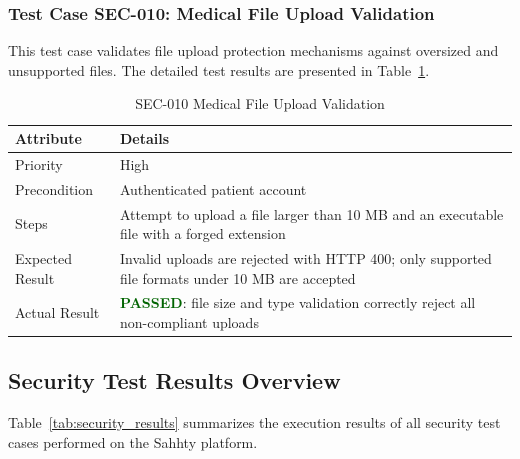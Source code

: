\subsubsection{Test Case SEC-010: Medical File Upload Validation}

This test case validates file upload protection mechanisms against oversized and unsupported files. The detailed test results are presented in Table~\ref{tab:sec010}.

\begin{table}[H]
\centering
\caption{SEC-010 Medical File Upload Validation}
\label{tab:sec010}
\renewcommand{\arraystretch}{1.3}

\begin{tabular}{|p{2cm}|p{13cm}|}
\hline
\rowcolor{red!10}

\textbf{Attribute} & \textbf{Details} \\
\hline
Priority & High \\
\hline
Precondition & Authenticated patient account \\
\hline
Steps & Attempt to upload a file larger than 10 MB and an executable file with a forged extension \\
\hline
Expected Result & Invalid uploads are rejected with HTTP 400; only supported file formats under 10 MB are accepted \\
\hline
Actual Result & \textbf{\textcolor{darkgreen}{PASSED}}: file size and type validation correctly reject all non-compliant uploads \\
\hline
\end{tabular}
\end{table}

\subsection{Security Test Results Overview}

Table~\ref{tab:security_results} summarizes the execution results of all security test cases performed on the Sahhty platform.

